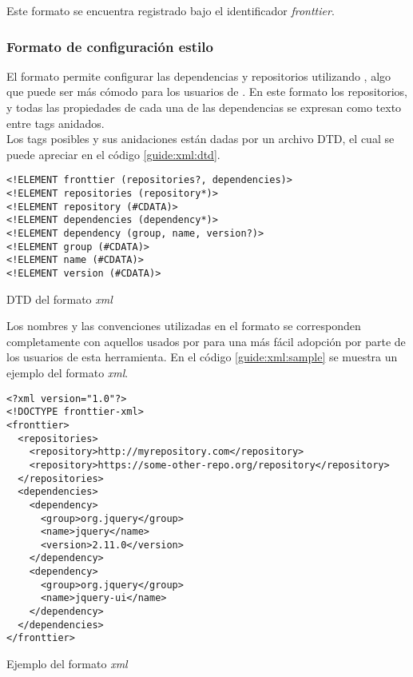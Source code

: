Este formato se encuentra registrado bajo el identificador \emph{fronttier}.

\subsubsection{Formato de configuración estilo \maven}
\label{subsubsec:formats:mvn}

El formato \xml permite configurar las dependencias y repositorios utilizando 
\xml, algo que puede ser más cómodo para los usuarios de \maven. En este 
formato los repositorios, \dependencies y todas las propiedades de cada una de 
las dependencias se expresan como texto entre tags \xml anidados.\\
Los tags posibles y sus anidaciones están dadas por un archivo DTD, el cual se 
puede apreciar en el código \ref{guide:xml:dtd}.

\begin{listing}[ht]
	\begin{verbatim}
<!ELEMENT fronttier (repositories?, dependencies)>
<!ELEMENT repositories (repository*)>
<!ELEMENT repository (#CDATA)>
<!ELEMENT dependencies (dependency*)>
<!ELEMENT dependency (group, name, version?)>
<!ELEMENT group (#CDATA)>
<!ELEMENT name (#CDATA)>
<!ELEMENT version (#CDATA)>
	\end{verbatim}
	\caption{DTD del formato \emph{xml}}
	\label{guide:xml:dtd}
\end{listing}

Los nombres y las convenciones utilizadas en el formato se corresponden 
completamente con aquellos usados por \apache \maven para una más fácil 
adopción por parte de los usuarios de esta herramienta. En el código 
\ref{guide:xml:sample} se muestra un ejemplo del formato \emph{xml}.

\begin{listing}[ht]
\begin{verbatim}
<?xml version="1.0"?>
<!DOCTYPE fronttier-xml>
<fronttier>
  <repositories>
    <repository>http://myrepository.com</repository>
    <repository>https://some-other-repo.org/repository</repository>
  </repositories>
  <dependencies>
    <dependency>
      <group>org.jquery</group>
      <name>jquery</name>
      <version>2.11.0</version>
    </dependency>
    <dependency>
      <group>org.jquery</group>
      <name>jquery-ui</name>
    </dependency>
  </dependencies>
</fronttier>
\end{verbatim}
\caption{Ejemplo del formato \emph{xml}}
\label{guide:xml:sample}
\end{listing}

